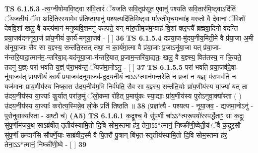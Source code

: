 \documentclass[17pt]{extarticle}
\begin{document}
                  \newline
                                \textbf{ TS 6.1.5.3} \newline
                  -त्य॒ग्नीषोमा॑वि॒ष्ट्वा स॑वि॒तारं॑ ॅयजति सवि॒तृप्र॑सूत ए॒वानु॑ पश्यति सवि॒तार॑मि॒ष्ट्वाऽदि॑तिं ॅयजती॒यं ॅवा अदि॑तिर॒स्यामे॒व प्र॑ति॒ष्ठायानु॑ पश्य॒त्यदि॑तिमि॒ष्ट्वा मा॑रु॒तीमृच॒मन्वा॑ह म॒रुतो॒ वै दे॒वानां॒ ॅविशो॑ देववि॒शां खलु॒ वै कल्प॑मानं मनुष्यवि॒शमनु॑ कल्पते॒ यन् मा॑रु॒तीमृच॑म॒न्वाह॑ वि॒शां क्लृप्त्यै᳚ ब्रह्मवा॒दिनो॑ वदन्ति प्रया॒जव॑दननूया॒जं प्रा॑य॒णीयं॑ का॒र्य॑-मनूया॒जव॑ - [  ] \textbf{  36} \newline
                  \newline
                                \textbf{ TS 6.1.5.4} \newline
                  दप्रया॒ज-मु॑दय॒नीय॒मिती॒मे वै प्र॑या॒जा अ॒मी अ॑नूया॒जाः सैव सा य॒ज्ञ्स्य॒ सन्त॑ति॒स्तत् तथा॒ न का॒र्य॑मा॒त्मा वै प्र॑या॒जाः प्र॒जाऽनू॑या॒जा यत् प्र॑या॒जा-न॑न्तरि॒यादा॒त्मान॑म॒-न्तरि॑या॒द्-यद॑नूया॒जा-न॑न्तरि॒यात् प्र॒जाम॒न्तरि॑या॒द्यतः॒ खलु॒ वै य॒ज्ञ्स्य॒ वित॑तस्य॒ न क्रि॒यते॒ तदनु॑ य॒ज्ञ्ः परा॑ भवति य॒ज्ञ्ं प॑रा॒भव॑न्तं॒ ॅयज॑मा॒नोऽनु॒ - [  ] \textbf{  37} \newline
                  \newline
                                \textbf{ TS 6.1.5.5} \newline
                  परा॑ भवति प्रया॒जव॑दे॒वा-नू॑या॒जव॑त् प्राय॒णीयं॑ का॒र्यं॑ प्रया॒जव॑दनूया॒जव॑-दुदय॒नीयं॒ नाऽऽ*त्मान॑मन्त॒रेति॒ न प्र॒जां न य॒ज्ञ्ः प॑रा॒भव॑ति॒ न यज॑मानः प्राय॒णीय॑स्य निष्का॒स उ॑दय॒नीय॑म॒भि निर्व॑पति॒ सैव सा य॒ज्ञ्स्य॒ सन्त॑ति॒र्याः प्रा॑य॒णीय॑स्य या॒ज्या॑ यत् ता उ॑दय॒नीय॑स्य या॒ज्याः᳚ कु॒र्यात् परा॑ङ॒मुं ॅलो॒कमा रो॑हेत् प्र॒मायु॑कः स्या॒द्याः प्रा॑य॒णीय॑स्य पुरोऽनुवा॒क्या᳚स्ता ( ) उ॑दय॒नीय॑स्य या॒ज्याः᳚ करोत्य॒स्मिन्ने॒व लो॒के प्रति॑ तिष्ठति ॥ \textbf{  38} \newline
                  \newline
                      (प्रज्ञा᳚त्यै - पश्यत्य - नूया॒जव॒ - द्यज॑मा॒नोऽनु॑ - पुरोनुवा॒क्या᳚स्ता - अ॒ष्टौ च॑)  \textbf{(A5)} \newline \newline
                                        \textbf{ TS 6.1.6.1} \newline
                  क॒द्रूश्च॒ वै सु॑प॒र्णी चा᳚ऽऽ*त्मरू॒पयो॑रस्पर्द्धेताꣳ॒॒ सा क॒द्रूः सु॑प॒र्णीम॑जय॒थ् साऽब्र॑वीत् तृ॒तीय॑स्यामि॒तो दि॒वि सोम॒स्तमा ह॑र॒ तेना॒ऽऽ*त्मानं॒ निष्क्री॑णी॒ष्वेती॒यं ॅवै क॒द्रूर॒सौ सु॑प॒र्णी छन्दाꣳ॑सि सौपर्णे॒याः साब्र॑वीद॒स्मै वै पि॒तरौ॑ पु॒त्रान् बि॑भृत-स्तृ॒तीय॑स्यामि॒तो दि॒वि सोम॒स्तमा ह॑र॒ तेना॒ऽऽ*त्मानं॒ निष्क्री॑णी॒ष्वे - [  ] \textbf{  39} \newline
\end{document}
